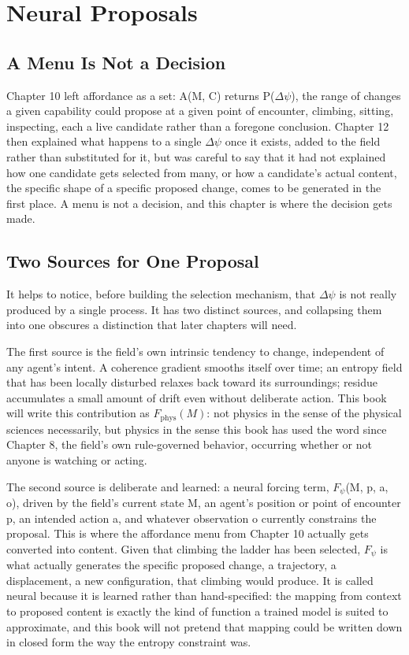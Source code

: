 \chapter{Neural Proposals}

\section{A Menu Is Not a Decision}

Chapter 10 left affordance as a set: A(M, C) returns P(\(\Delta\psi\)), the range of changes a given capability could propose at a given point of encounter, climbing, sitting, inspecting, each a live candidate rather than a foregone conclusion. Chapter 12 then explained what happens to a single \(\Delta\psi\) once it exists, added to the field rather than substituted for it, but was careful to say that it had not explained how one candidate gets selected from many, or how a candidate's actual content, the specific shape of a specific proposed change, comes to be generated in the first place. A menu is not a decision, and this chapter is where the decision gets made.

\section{Two Sources for One Proposal}

It helps to notice, before building the selection mechanism, that \(\Delta\psi\) is not really produced by a single process. It has two distinct sources, and collapsing them into one obscures a distinction that later chapters will need.

The first source is the field's own intrinsic tendency to change, independent of any agent's intent. A coherence gradient smooths itself over time; an entropy field that has been locally disturbed relaxes back toward its surroundings; residue accumulates a small amount of drift even without deliberate action. This book will write this contribution as \(F_{\mathrm{phys}}(M)\): not physics in the sense of the physical sciences necessarily, but physics in the sense this book has used the word since Chapter 8, the field's own rule-governed behavior, occurring whether or not anyone is watching or acting.

The second source is deliberate and learned: a neural forcing term, \(F_\psi\)(M, p, a, o), driven by the field's current state M, an agent's position or point of encounter p, an intended action a, and whatever observation o currently constrains the proposal. This is where the affordance menu from Chapter 10 actually gets converted into content. Given that climbing the ladder has been selected, \(F_\psi\) is what actually generates the specific proposed change, a trajectory, a displacement, a new configuration, that climbing would produce. It is called neural because it is learned rather than hand-specified: the mapping from context to proposed content is exactly the kind of function a trained model is suited to approximate, and this book will not pretend that mapping could be written down in closed form the way the entropy constraint was.

